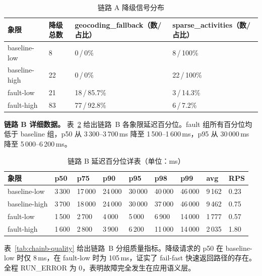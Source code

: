 \begin{table}[htbp]
  \centering
  \small
  \caption{链路 A 降级信号分布}
  \label{tab:chaina-signals}
  \begin{tabularx}{\textwidth}{p{2.5cm}p{1.8cm}p{4cm}X}
    \toprule
    象限 & 降级总数 & geocoding\_fallback（数/占比） & sparse\_activities（数/占比） \\
    \midrule
    baseline-low  &  8 &  0\,/\,0\%    &  8\,/\,100\% \\
    baseline-high & 22 &  0\,/\,0\%    & 22\,/\,100\% \\
    fault-low     & 21 & 18\,/\,85.7\% &  3\,/\,14.3\% \\
    fault-high    & 83 & 77\,/\,92.8\% &  6\,/\,7.2\% \\
    \bottomrule
  \end{tabularx}
\end{table}

\noindent\textbf{链路 B 详细数据。}
表~\ref{tab:chainb-latency} 给出链路~B 各象限延迟百分位。fault 组所有百分位均低于 baseline 组，p50 从 3\,300--3\,700\,ms 降至 1\,500--1\,600\,ms，p95 从 30\,000\,ms 降至 5\,000--6\,200\,ms。

\begin{table}[htbp]
  \centering
  \footnotesize
  \caption{链路 B 延迟百分位详表（单位：ms）}
  \label{tab:chainb-latency}
  \begin{tabularx}{\textwidth}{p{2.4cm}XXXXXXXX}
    \toprule
    象限 & p50 & p75 & p90 & p95 & p98 & p99 & avg & RPS \\
    \midrule
    baseline-low  & 3\,300 & 17\,000 & 24\,000 & 30\,000 & 40\,000 & 46\,000 &  9\,162 & 0.23 \\
    baseline-high & 3\,700 & 18\,000 & 24\,000 & 30\,000 & 37\,000 & 46\,000 &  9\,462 & 0.75 \\
    fault-low     & 1\,500 &  2\,700 &  4\,000 &  5\,000 &  6\,900 & 14\,000 &  1\,777 & 0.57 \\
    fault-high    & 1\,600 &  2\,800 &  3\,900 &  6\,200 & 11\,000 & 14\,000 &  2\,035 & 1.80 \\
    \bottomrule
  \end{tabularx}
\end{table}

表~\ref{tab:chainb-quality} 给出链路~B 分组质量指标。降级请求的 p50 在 baseline-low 时仅 8\,ms，在 fault-low 时为 105\,ms，证实了 fail-fast 快速返回路径的存在。全程 RUN\_ERROR 为 0，表明故障完全发生在应用语义层。

